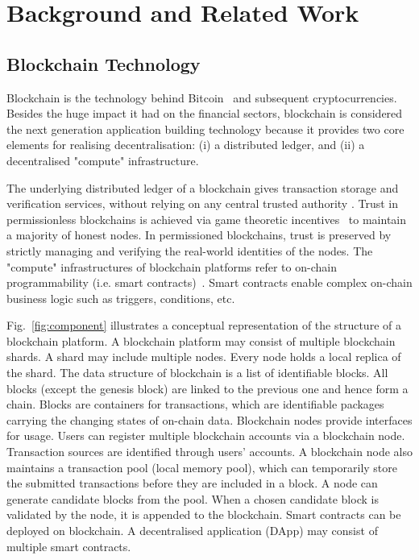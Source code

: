 \documentclass{article}
\begin{document}
\section{Background and Related Work}
\label{background}

\subsection{Blockchain Technology}
Blockchain is the technology behind Bitcoin~\cite{Satoshi:bitcoin} and subsequent cryptocurrencies. 
Besides the huge impact it had on the financial sectors, blockchain is considered the next generation application building technology because it provides two core elements for realising decentralisation: (i) a distributed ledger, and (ii) a decentralised "compute" infrastructure.

The underlying distributed ledger of a blockchain gives transaction storage and verification services, without relying on any central trusted authority \cite{scheuermann2015iacr}. Trust in permissionless blockchains is achieved via game theoretic incentives~\cite{Satoshi:bitcoin} to maintain a majority of honest nodes. 
In permissioned blockchains, trust is preserved by strictly managing and verifying the real-world identities of the nodes. The "compute" infrastructures of blockchain platforms refer to on-chain programmability (i.e. smart contracts)~\cite{Omohundro:2014}. Smart contracts enable complex on-chain business logic such as triggers, conditions, etc.

Fig.~\ref{fig:component} illustrates a conceptual representation of the structure of a blockchain platform. A blockchain platform may consist of multiple blockchain shards. A shard may include multiple nodes. Every node holds a local replica of the shard. The data structure of blockchain is a list of identifiable blocks. All blocks (except the genesis block) are linked to the previous one and hence form a chain. Blocks are containers for transactions, which are identifiable packages carrying the changing states of on-chain data. Blockchain nodes provide interfaces for usage. Users can register multiple blockchain accounts via a blockchain node. Transaction sources are identified through users' accounts. A blockchain node also maintains a transaction pool (local memory pool), which can temporarily store the submitted transactions before they are included in a block. A node can generate candidate blocks from the pool. When a chosen candidate block is validated by the node, it is appended to the blockchain. Smart contracts can be deployed on blockchain. A decentralised application (DApp) may consist of multiple smart contracts.
\end{document}
